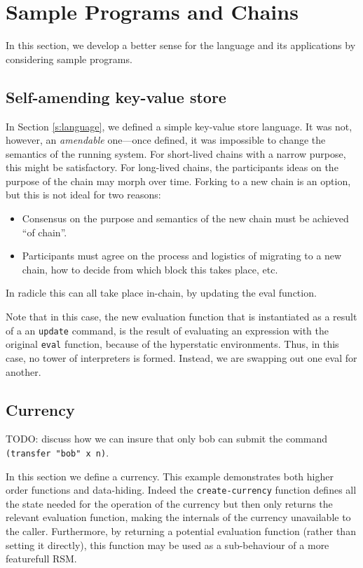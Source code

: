 \section{Sample Programs and Chains}

In this section, we develop a better sense for the language and its
applications by considering sample programs.

\subsection{Self-amending key-value store}

In Section \ref{s:language}, we defined a simple key-value store language. It
was not, however, an \emph{amendable} one---once defined, it was impossible to
change the semantics of the running system. For short-lived chains with a narrow
purpose, this might be satisfactory. For long-lived chains, the participants
ideas on the purpose of the chain may morph over time. Forking to a new chain is
an option, but this is not ideal for two reasons:
\begin{itemize}
  \item Consensus on the purpose and semantics of the new chain must be achieved
    ``of chain''.
  \item Participants must agree on the process and logistics of migrating to a
    new chain, how to decide from which block this takes place, etc.
\end{itemize}
In radicle this can all take place in-chain, by updating the eval function.



Note that in this case, the new evaluation function that is instantiated as a
result of a an \texttt{update} command, is the result of evaluating an
expression with the original \texttt{eval} function, because of the hyperstatic
environments. Thus, in this case, no tower of interpreters is formed. Instead,
we are swapping out one eval for another.

\subsection{Currency}

TODO: discuss how we can insure that only bob can submit the command
\texttt{(transfer "bob" x n)}.

In this section we define a currency. This example demonstrates both higher
order functions and data-hiding. Indeed the \texttt{create-currency} function
defines all the state needed for the operation of the currency but then only
returns the relevant evaluation function, making the internals of the currency
unavailable to the caller. Furthermore, by returning a potential evaluation
function (rather than setting it directly), this function may be used as a
sub-behaviour of a more featurefull RSM.

